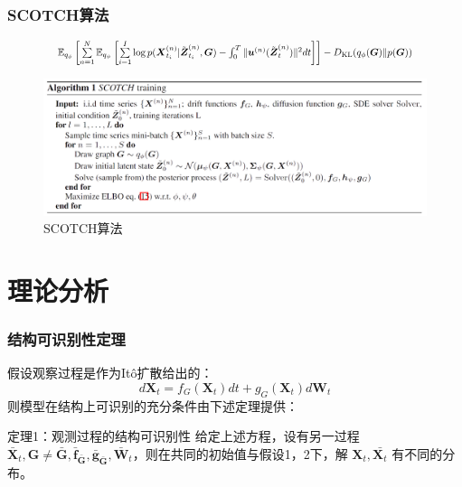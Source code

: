 \documentclass{beamer}
\begin{document}
\begin{frame}
\frametitle{SCOTCH算法}
\begin{equation*}
    \scalebox{0.78}{$\mathbb{E}_{q_{\phi}}\left[\sum\limits_{n=1}^{N}\mathbb{E}_{q_{\psi}}\left[\sum\limits_{i=1}^{I}\log p(\boldsymbol X_{t_{i}}^{(n)}|\tilde{\boldsymbol Z}_{t_{i}}^{(n)},\boldsymbol G)-\int_{0}^{T}\|\boldsymbol u^{(n)}(\tilde{\boldsymbol Z}_{t}^{(n)})\|^{2}dt\right]\right]-D_{\mathrm{KL}}(q_{\phi}(\boldsymbol{G})\|p(\boldsymbol{G}))$}
\end{equation*}
\begin{figure}[htbp]
\centering  
\includegraphics[width=\linewidth]{SCOTCH.png}
\caption{SCOTCH算法}
\end{figure}

\end{frame}

\section{理论分析}
\begin{frame}
\frametitle{结构可识别性定理}
假设观察过程是作为It\^o扩散给出的：
\begin{equation} d\boldsymbol{X}_t=f_G(\boldsymbol{X}_t)dt+g_G(\boldsymbol{X}_t)d\boldsymbol{W}_t
\end{equation}
则模型在结构上可识别的充分条件由下述定理提供：
\begin{block}{定理1：观测过程的结构可识别性}
    给定上述方程，设有另一过程 $\bar{\boldsymbol X}_{t}, \boldsymbol G\neq\bar{\boldsymbol G}, \bar{\boldsymbol f}_{\bar{\boldsymbol G}}, \bar{\boldsymbol g}_{\bar{\boldsymbol G}}, \bar{\boldsymbol W}_{t}$，则在共同的初始值与假设1，2下，解 $\boldsymbol X_t,\bar{\boldsymbol X_t}$ 有不同的分布。
\end{block}
\end{frame}
\end{document}
